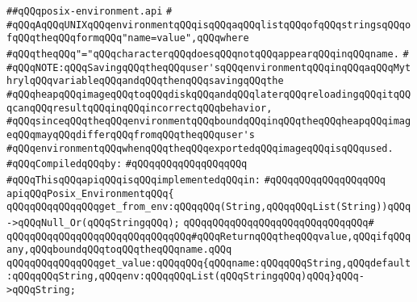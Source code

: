 \label{src/lib/posix/posix-environment.api}
\verb|##qQQqposix-environment.api|\newline
\verb|#|\newline
\verb|#qQQqAqQQqUNIXqQQqenvironmentqQQqisqQQqaqQQqlistqQQqofqQQqstringsqQQqofqQQqtheqQQqformqQQq"name=value",qQQqwhere|\newline
\verb|#qQQqtheqQQq"="qQQqcharacterqQQqdoesqQQqnotqQQqappearqQQqinqQQqname.|\newline
\verb|#|\newline
\verb|#qQQqNOTE:qQQqSavingqQQqtheqQQquser'sqQQqenvironmentqQQqinqQQqaqQQqMythrylqQQqvariableqQQqandqQQqthenqQQqsavingqQQqthe|\newline
\verb|#qQQqheapqQQqimageqQQqtoqQQqdiskqQQqandqQQqlaterqQQqreloadingqQQqitqQQqcanqQQqresultqQQqinqQQqincorrectqQQqbehavior,|\newline
\verb|#qQQqsinceqQQqtheqQQqenvironmentqQQqboundqQQqinqQQqtheqQQqheapqQQqimageqQQqmayqQQqdifferqQQqfromqQQqtheqQQquser's|\newline
\verb|#qQQqenvironmentqQQqwhenqQQqtheqQQqexportedqQQqimageqQQqisqQQqused.|\newline
\newline
\verb|#qQQqCompiledqQQqby:|\newline
\verb|#qQQqqQQqqQQqqQQqqQQq|\newline
\newline
\newline
\newline
\newline
\verb|#qQQqThisqQQqapiqQQqisqQQqimplementedqQQqin:|\newline
\verb|#qQQqqQQqqQQqqQQqqQQq|\newline
\newline
\verb|apiqQQqPosix_EnvironmentqQQq{|\newline
\newline
\verb|qQQqqQQqqQQqqQQqget_from_env:qQQqqQQq(String,qQQqqQQqList(String))qQQq->qQQqNull_Or(qQQqStringqQQq);|\newline
\verb|qQQqqQQqqQQqqQQqqQQqqQQqqQQqqQQq#|\newline
\verb|qQQqqQQqqQQqqQQqqQQqqQQqqQQqqQQq#qQQqReturnqQQqtheqQQqvalue,qQQqifqQQqany,qQQqboundqQQqtoqQQqtheqQQqname.qQQq|\newline
\newline
\verb|qQQqqQQqqQQqqQQqget_value:qQQqqQQq{qQQqname:qQQqqQQqString,qQQqdefault:qQQqqQQqString,qQQqenv:qQQqqQQqList(qQQqStringqQQq)qQQq}qQQq->qQQqString;|\newline
